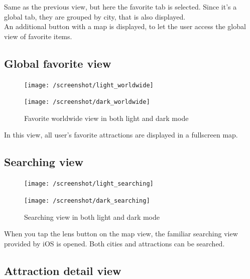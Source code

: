 \documentclass[a4paper, 11pt, parskip=half]{scrreprt}
\theoremstyle{definition}
\begin{document}
Same as the previous view, but here the favorite tab is selected. Since it's a global tab, they are grouped by city, that is also displayed. 
\\An additional button with a map is displayed, to let the user access the global view of favorite items.

\subsection{Global favorite view}

\begin{figure}[H]
	\centering
	\begin{minipage}{.5\textwidth}
  	\centering
  	\texttt{[image: /screenshot/light\_worldwide]}
  	\label{fig:test1}
	\end{minipage}%
	\begin{minipage}{.5\textwidth}
  	\centering
  	\texttt{[image: /screenshot/dark\_worldwide]}
  	\label{fig:test2}
	\end{minipage}
	\caption{Favorite worldwide view in both light and dark mode}
\end{figure}

In this view, all user's favorite attractions are displayed in a fullscreen map. 

\subsection{Searching view}

\begin{figure}[H]
	\centering
	\begin{minipage}{.5\textwidth}
  	\centering
  	\texttt{[image: /screenshot/light\_searching]}
  	\label{fig:test1}
	\end{minipage}%
	\begin{minipage}{.5\textwidth}
  	\centering
  	\texttt{[image: /screenshot/dark\_searching]}
  	\label{fig:test2}
	\end{minipage}
	\caption{Searching view in both light and dark mode}
\end{figure}

When you tap the lens button on the map view, the familiar searching view provided by iOS is opened. Both cities and attractions can be searched.

\subsection{Attraction detail view}
\end{document}
